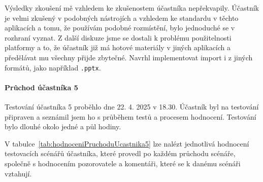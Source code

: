 Výsledky zkoušení mě vzhledem ke zkušenostem účastníka nepřekvapily.
Účastník je velmi zkušený v podobných nástrojích a vzhledem ke standardu v těchto aplikacích a tomu, že používám podobné rozmístění, bylo jednoduché se v rozhraní vyznat.
Z další diskuze jsme se dostali k problému použitelnosti platformy a to, že účastník již má hotové materiály v jiných aplikacích a předělávat mu všechny přijde zbytečné.
Navrhl implementovat import i z jiných formátů, jako například \verb|.pptx|.

\paragraph{Průchod účastníka 5}

Testování účastníka 5 proběhlo dne 22. 4. 2025 v 18.30. 
Účastník byl na testování připraven a seznámil jsem ho s průběhem testů a procesem hodnocení. 
Testování bylo dlouhé okolo jedné a půl hodiny.

V tabulce~\ref{tab:hodnoceniPruchoduUcastnika5} lze nalézt jednotlivá hodnocení testovacích scénářů účastníka, které provedl po každém průchodu scénáře, společně s hodnocením pozorovatele a komentáři, které se k danému scénáři vztahují.

